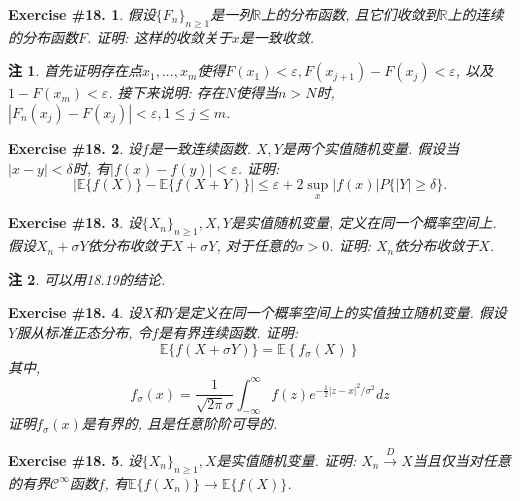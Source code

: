 \documentclass[UTF8, a4paper]{article}
\newtheorem{exercise}{Exercise \#18.}
\newtheorem*{remark}{注}
\begin{document}
\begin{exercise}
假设\(\{F_n\}_{n\geq 1}\)是一列\(\mathbb{R}\)上的分布函数, 且它们收敛到\(\mathbb{R}\)上的连续的分布函数\(F\).
证明: 这样的收敛关于\(x\)是一致收敛.
\end{exercise}





\begin{remark}
首先证明存在点\(x_1, ..., x_m\)使得\(F(x_1) < \varepsilon, F(x_{j+1}) - F(x_{j}) < \varepsilon\), 以及\(1 - F(x_m) < \varepsilon\).
接下来说明: 存在\(N\)使得当\(n>N\)时, \(|F_n(x_j) - F(x_j)| < \varepsilon, 1 \leq j \leq m\).
\end{remark}


\begin{exercise}
设\(f\)是一致连续函数. \(X,Y\)是两个实值随机变量.
假设当\(|x-y| < \delta\)时, 有\(|f(x) - f(y)| < \varepsilon\). 证明:
$$
|\mathbb{E}\{f(X)\}-\mathbb{E}\{f(X+Y)\}| \leq \varepsilon+2 \sup _x|f(x)| P\{|Y| \geq \delta\} .
$$
\end{exercise}


\begin{exercise}
设\(\{X_n\}_{n \geq 1}, X, Y\)是实值随机变量, 定义在同一个概率空间上.
假设\(X_n + \sigma Y\)依分布收敛于\(X + \sigma Y\), 对于任意的\(\sigma > 0\).
证明: \(X_n\)依分布收敛于\(X\).
\end{exercise}
\begin{remark}
可以用18.19的结论.
\end{remark}


\begin{exercise}
设\(X\)和\(Y\)是定义在同一个概率空间上的实值独立随机变量. 
假设\(Y\)服从标准正态分布, 令\(f\)是有界连续函数. 证明:
$$
\mathbb{E}\{f(X+\sigma Y)\}=\mathbb{E}\left\{f_\sigma(X)\right\}
$$
其中, 
$$
f_\sigma(x)=\frac{1}{\sqrt{2 \pi} \sigma} \int_{-\infty}^{\infty} f(z) e^{-\frac{1}{2}|z-x|^2 / \sigma^2} d z
$$
证明\(f_\sigma(x)\)是有界的, 且是任意阶阶可导的.
\end{exercise}



\begin{exercise}
设\(\{X_n\}_{n\geq 1}, X\)是实值随机变量. 证明: \(X_n \xrightarrow{D}X\)当且仅当对任意的有界\(\mathcal{C}^\infty\)函数\(f\), 有\(\mathbb{E}\{f(X_n)\} \to \mathbb{E}\{f(X)\}\).
\end{exercise}











\end{document}
